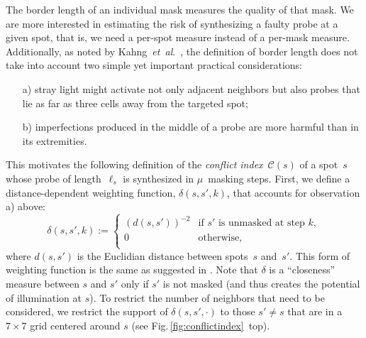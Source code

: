 \documentclass{llncs}
\begin{document}
The border length of an individual mask measures the quality of that
mask. We are more interested in estimating the risk of synthesizing a faulty
probe at a given spot, that is, we need a per-spot measure
instead of a per-mask measure. Additionally, as noted by Kahng~{\it et~al}.~\cite{KAHNG03A},
the definition of border length does not take into account two
simple yet important practical considerations:
\begin{itemize}
\item[a)] stray light might activate not only adjacent neighbors but
  also probes that lie as far as three cells away from the targeted
  spot;
\item[b)] imperfections produced in the middle of a probe are more
  harmful than in its extremities.
\end{itemize}
This motivates the following definition of the \emph{conflict
  index}~$\mathcal{C}(s)$ of a spot~$s$ whose probe of
length~$\ell_{s}$ is synthesized in $\mu$~masking steps. First, we
define a distance-dependent weighting function, $\delta(s,s',k)$, that
accounts for observation a) above:
\begin{equation}
\label{eq:dist_weight}
\delta(s,s',k) :=
        \left\{
                \begin{array}{ll}
                        (d(s,s'))^{-2} & \mbox{if $s'$ is unmasked at step $k$}, \\
                        0 & \mbox{otherwise}, \\
                \end{array}
        \right.
\end{equation}
where $d(s,s')$ is the Euclidian distance between spots~$s$ and~$s'$.
This form of weighting function is the same as suggested in
\cite{KAHNG03A}.  Note that $\delta$ is a ``closeness'' measure
between $s$ and $s'$ only if $s'$ is
not masked (and thus creates the potential of illumination at $s$). To
restrict the number of neighbors that need to be considered, we
restrict the support of $\delta(s,s',\cdot)$ to those $s'\neq s$ that
are in a $7\times 7$ grid centered around $s$ (see
Fig.\,\ref{fig:conflictindex}~top).
\end{document}
